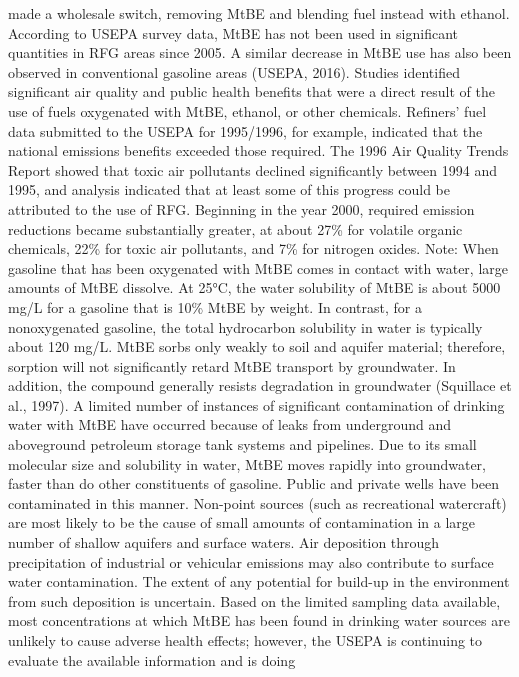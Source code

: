 \documentclass{article}
\begin{document}
made a wholesale switch, removing MtBE and blending fuel instead with
ethanol. According to USEPA survey data, MtBE has not been used in
significant quantities in RFG areas since 2005. A similar decrease in
MtBE use has also been observed in conventional gasoline areas (USEPA,
2016). Studies identified significant air quality and public health
benefits that were a direct result of the use of fuels oxygenated with
MtBE, ethanol, or other chemicals. Refiners' fuel data submitted to the
USEPA for 1995/1996, for example, indicated that the national emissions
benefits exceeded those required. The 1996 Air Quality Trends Report
showed that toxic air pollutants declined significantly between 1994 and
1995, and analysis indicated that at least some of this progress could
be attributed to the use of RFG. Beginning in the year 2000, required
emission reductions became substantially greater, at about 27\% for
volatile organic chemicals, 22\% for toxic air pollutants, and 7\% for
nitrogen oxides. Note: When gasoline that has been oxygenated with MtBE
comes in contact with water, large amounts of MtBE dissolve. At 25°C,
the water solubility of MtBE is about 5000 mg/L for a gasoline that is
10\% MtBE by weight. In contrast, for a nonoxygenated gasoline, the
total hydrocarbon solubility in water is typically about 120 mg/L. MtBE
sorbs only weakly to soil and aquifer material; therefore, sorption will
not significantly retard MtBE transport by groundwater. In addition, the
compound generally resists degradation in groundwater (Squillace et al.,
1997). A limited number of instances of significant contamination of
drinking water with MtBE have occurred because of leaks from underground
and aboveground petroleum storage tank systems and pipelines. Due to its
small molecular size and solubility in water, MtBE moves rapidly into
groundwater, faster than do other constituents of gasoline. Public and
private wells have been contaminated in this manner. Non-point sources
(such as recreational watercraft) are most likely to be the cause of
small amounts of contamination in a large number of shallow aquifers and
surface waters. Air deposition through precipitation of industrial or
vehicular emissions may also contribute to surface water contamination.
The extent of any potential for build-up in the environment from such
deposition is uncertain. Based on the limited sampling data available,
most concentrations at which MtBE has been found in drinking water
sources are unlikely to cause adverse health effects; however, the USEPA
is continuing to evaluate the available information and is doing
\end{document}
